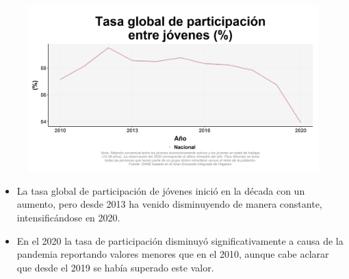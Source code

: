     \begin{figure}[H]
        \caption[Tasa global de participación entre jóvenes a nivel nacional ]{\label{particjov_nal_trend} }
        \begin{center}
        \includegraphics[width=\textwidth,keepaspectratio]{img/var_86_trend.png}
        \end{center}
    \end{figure}
            \begin{itemize}
                \item La tasa global de participación de jóvenes inició en la década con un aumento, pero desde 2013 ha venido disminuyendo de manera constante, intensificándose en 2020.
                \item En el 2020 la tasa de participación disminuyó significativamente a causa de la pandemia reportando valores menores que en el 2010, aunque cabe aclarar que desde el 2019 se había superado este valor.
                \end{itemize}

